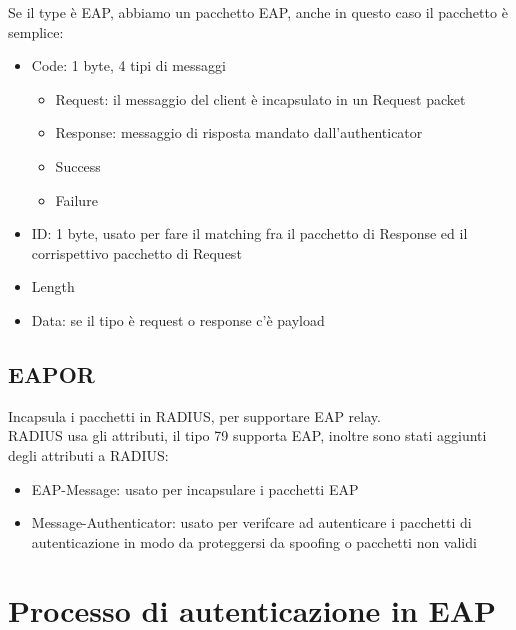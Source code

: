 \documentclass[12pt, oneside]{extbook} %
\begin{document}
Se il type è EAP, abbiamo un pacchetto EAP, anche in questo caso il pacchetto è semplice:
    \begin{itemize}
        \item Code: 1 byte, 4 tipi di messaggi
        \begin{itemize}
            \item Request: il messaggio del client è incapsulato in un Request packet
            \item Response: messaggio di risposta mandato dall'authenticator
            \item Success
            \item Failure
        \end{itemize}
        \item ID: 1 byte, usato per fare il matching fra il pacchetto di Response ed il corrispettivo pacchetto di Request
        \item Length
        \item Data: se il tipo è request o response c'è payload 
    \end{itemize}

\subsection{EAPOR}
Incapsula i pacchetti in RADIUS, per supportare EAP relay.
\\RADIUS usa gli attributi, il tipo 79 supporta EAP, inoltre sono stati aggiunti degli attributi a RADIUS:
\begin{itemize}
    \item EAP-Message: usato per incapsulare i pacchetti EAP
    \item Message-Authenticator: usato per verifcare ad autenticare i pacchetti di autenticazione in modo da proteggersi da spoofing o pacchetti non validi
\end{itemize}

\section{Processo di autenticazione in EAP}
\end{document}
